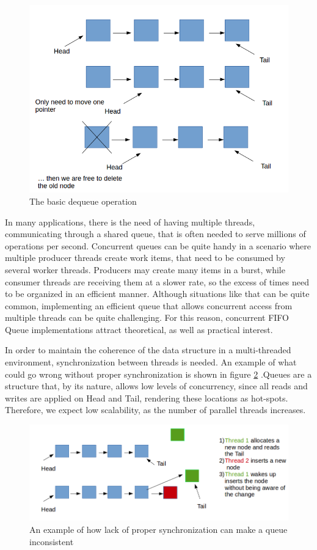 \begin{figure}
 \centering
  \includegraphics[scale=0.5]{basic_dequeue.png}
\caption{ The basic dequeue operation}
\label{basic_dequeue}
\end{figure}

In many applications, there is the need of having multiple threads, communicating through a shared queue, that is often needed to serve millions of operations per second. Concurrent queues can be quite handy in a scenario where multiple producer threads create work items, that need to be consumed by several worker threads. Producers may create many items in a burst, while consumer threads are receiving them at a slower rate, so the excess of times need to be organized in an efficient manner. Although situations like that can be quite common, implementing an efficient queue that allows concurrent access from multiple threads can be quite challenging. For this reason, concurrent FIFO Queue implementations attract theoretical, as well as practical interest. 
 
In order to maintain the coherence of the data structure in a multi-threaded environment, synchronization between threads is needed. An example of what could go wrong without proper synchronization is shown in figure \ref{queue_no_sync} .Queues are a structure that, by its nature, allows low levels of concurrency, since all reads and writes are applied on Head and Tail, rendering these locations as hot-spots. Therefore, we expect low scalability, as the number of parallel threads increases.

\begin{figure}
 \centering
  \includegraphics[scale=0.5]{queue_no_sync.png}
\caption{An example of how lack of proper synchronization can make a queue inconsistent}
\label{queue_no_sync}
\end{figure}

